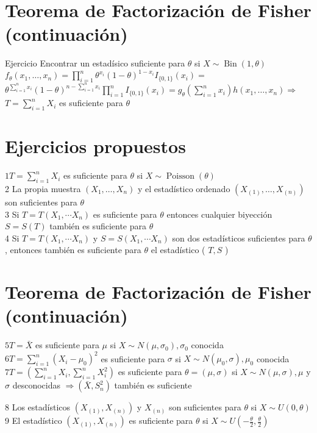 \section*{Teorema de Factorización de Fisher (continuación)}
Ejercicio Encontrar un estadísico suficiente para $\theta$ si $X \sim \operatorname{Bin}(1, \theta)$ $f_{\theta}\left(x_{1}, \ldots, x_{n}\right)=\prod_{i=1}^{n} \theta^{x_{i}}(1-\theta)^{1-x_{i}} I_{\{0,1\}}\left(x_{i}\right)=$ $\theta^{\sum_{i=1}^{n} x_{i}}(1-\theta)^{n-\sum_{i=1}^{n} x_{i}} \prod_{i=1}^{n} I_{\{0,1\}}\left(x_{i}\right)=g_{\theta}\left(\sum_{i=1}^{n} x_{i}\right) h\left(x_{1}, \ldots, x_{n}\right) \Rightarrow$ $T=\sum_{i=1}^{n} X_{i}$ es suficiente para $\theta$

\section*{Ejercicios propuestos}
$1 T=\sum_{i=1}^{n} X_{i}$ es suficiente para $\theta$ si $X \sim \operatorname{Poisson}(\theta)$\\
2 La propia muestra $\left(X_{1}, \ldots, X_{n}\right)$ y el estadístico ordenado $\left(X_{(1)}, \ldots, X_{(n)}\right)$ son suficientes para $\theta$\\
3 Si $T=T\left(X_{1}, \cdots X_{n}\right)$ es suficiente para $\theta$ entonces cualquier biyección $S=S(T)$ también es suficiente para $\theta$\\
4 Si $T=T\left(X_{1}, \cdots X_{n}\right)$ y $S=S\left(X_{1}, \cdots X_{n}\right)$ son dos estadísticos suficientes para $\theta$, entonces también es suficiente para $\theta$ el estadístico ( $T, S$ )

\section*{Teorema de Factorización de Fisher (continuación)}
$5 T=\bar{X}$ es suficiente para $\mu$ si $X \sim N\left(\mu, \sigma_{0}\right), \sigma_{0}$ conocida\\
$6 T=\sum_{i=1}^{n}\left(X_{i}-\mu_{0}\right)^{2}$ es suficiente para $\sigma$ si $X \sim N\left(\mu_{0}, \sigma\right), \mu_{0}$ conocida\\
$7 T=\left(\sum_{i=1}^{n} X_{i}, \sum_{i=1}^{n} X_{i}^{2}\right)$ es suficiente para $\theta=(\mu, \sigma)$ si $X \sim N(\mu, \sigma), \mu$ y $\sigma$ desconocidas $\Rightarrow\left(\bar{X}, S_{n}^{2}\right)$ también es suficiente

8 Los estadísticos $\left(X_{(1)}, X_{(n)}\right)$ y $X_{(n)}$ son suficientes para $\theta$ si $X \sim U(0, \theta)$\\
9 El estadístico $\left(X_{(1)}, X_{(n)}\right)$ es suficiente para $\theta$ si $X \sim U\left(-\frac{\theta}{2}, \frac{\theta}{2}\right)$

